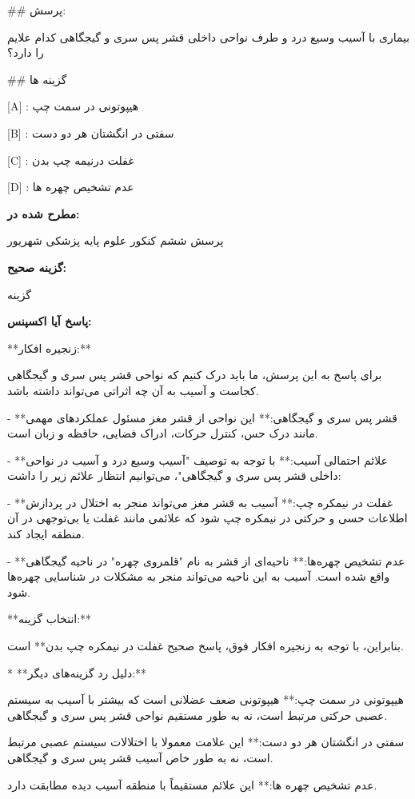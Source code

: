 \#\# پرسش:

بیماری با آسیب وسیع درد و طرف نواحی داخلی قشر پس سری و گیجگاهی کدام علایم را دارد؟ 


\#\# گزینه ها

[A] : هيپوتونی در سمت چپ

[B] : سفتی در انگشتان هر دو دست

[C] : غفلت درنيمه چپ بدن

[D] : عدم تشخيص چهره ها 

\textbf{
مطرح شده در:
}

پرسش ششم کنکور علوم پایه پزشکی شهریور

\textbf{
گزینه صحیح:
}

گزینه
\lr{[D]}


\textbf{
پاسخ آیا اکسپنس:
}

**زنجیره افکار:** 

برای پاسخ به این پرسش، ما باید درک کنیم که نواحی قشر پس سری و گیجگاهی کجاست و آسیب به آن چه اثراتی می‌تواند داشته باشد.  

- **قشر پس سری و گیجگاهی:** این نواحی از قشر مغز مسئول عملکردهای مهمی مانند درک حس،  کنترل حرکات، ادراک فضایی، حافظه  و زبان است.

- **علائم احتمالی آسیب:** با توجه به توصیف "آسیب وسیع درد و آسیب در نواحی داخلی قشر پس سری و گیجگاهی"،  می‌توانیم انتظار علائم زیر را داشت:

    - **غفلت در نیمکره چپ:**  آسیب به قشر مغز می‌تواند منجر به  اختلال در پردازش اطلاعات حسی و حرکتی در نیمکره چپ شود که  علائمی مانند غفلت یا بی‌توجهی در آن منطقه ایجاد کند.

    - **عدم تشخیص چهره‌ها:**   ناحیه‌ای از قشر به نام "قلمروی چهره" در ناحیه گیجگاهی واقع شده است. آسیب به این ناحیه می‌تواند منجر به مشکلات در شناسایی چهره‌ها شود.

**انتخاب گزینه:**

بنابراین، با توجه به زنجیره افکار فوق، پاسخ صحیح
\lr{**[C]}
غفلت در نیمکره چپ بدن** است. 


* **دلیل رد گزینه‌های دیگر:**

    \lr{* **[A]}
    هيپوتونی در سمت چپ:** هيپوتونی ضعف عضلانی است که بیشتر با آسیب به سیستم عصبی حرکتی مرتبط است، نه به طور مستقیم نواحی قشر پس سری و گیجگاهی.
    
    \lr{* **[B]}
    سفتی در انگشتان هر دو دست:**  این علامت معمولا با اختلالات سیستم عصبی مرتبط است، نه به طور خاص آسیب قشر پس سری و گیجگاهی.
    
    \lr{* **[D]}
    عدم تشخیص چهره ها:** این علائم مستقیماً با منطقه آسیب  دیده مطابقت دارد.

